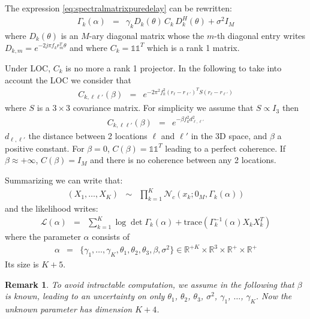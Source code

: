 \documentclass[a4paper, 12pt]{report}
\newcommand{\diag}[1]{\mathrm{diag}\left( #1 \right)}
\newcommand{\trace}[1]{\mathrm{trace}\left( #1 \right)}
\newtheorem{remark}{Remark}
\begin{document}
The expression \eqref{eq:spectralmatrixpuredelay} can be rewritten:
\begin{eqnarray}
\label{eq:spectralmatrixLOC}
\Gamma_{k}(\alpha)&=&\gamma_{k}D_{k}(\theta)\, C_{k}\,D_{k}^{H}(\theta)+\sigma^{2}I_{M}
\end{eqnarray}
where $D_{k}(\theta)$ is an $M$-ary diagonal matrix whose the $m$-th diagonal entry writes $D_{k,m}=e^{-2j\pi f_{k} r_{m}^{T}\theta }$ and where $C_{k}=\mathds{1}\mathds{1}^{T}$ which is a rank 1 matrix.


Under LOC, $C_{k}$ is no more a rank 1 projector.  In the following to take into account the LOC we consider that 
\begin{eqnarray}
 \label{eq:CkwithGauss}
 C_{k,\ell\ell'} (\beta)&=&e^{-2\pi^2f_k^2(r_{\ell}-r_{\ell'})^TS(r_{\ell}-r_{\ell'})}
\end{eqnarray}
where $S$ is a $3\times 3$ covariance matrix. For simplicity we assume that $S\propto I_3$ then
\begin{eqnarray}
 \label{eq:CkwithGauss-2}
 C_{k,\ell\ell'} (\beta)&=&e^{-\beta f_k^2 d_{\ell,\ell'}^2}
\end{eqnarray}
$d_{\ell,\ell'}$ the distance between 2 locations $\ell$ and $\ell'$ in the 3D space, and $\beta$ a positive constant. For $\beta=0$, $C(\beta)=\mathds{1}\mathds{1}^{T}$ leading to a perfect coherence. If $\beta\approx+\infty$, $C(\beta)=I_{M}$ and there is no coherence between any 2 locations.

Summarizing   we can write that:
\begin{eqnarray*}
 (X_{1},\ldots,X_{K}) &\sim&\prod_{k=1}^{K}\mathcal{N}_{c}(x_{k};0_{M},\Gamma_{k}(\alpha))
\end{eqnarray*}
and the likelihood writes:
\begin{eqnarray}
 \mathcal{L}(\alpha)&=&
 \sum_{k=1}^{K}\log\det\Gamma_{k}(\alpha)+\trace{\Gamma_{k}^{-1}(\alpha)X_{k}X_{k}^{T}}
\end{eqnarray}
where the parameter $\alpha$ consists of
\begin{eqnarray}
\alpha&=&
\{
\gamma_{1},\ldots,\gamma_{K},\theta_{1},\theta_{2},\theta_{3},\beta,\sigma^{2}
\}
\in \mathds{R}^{+K}\times  \mathds{R}^{3}\times \mathds{R}^{+}\times \mathds{R}^{+}
\end{eqnarray}
Its size is $K+5$.

\begin{remark}
To avoid intractable computation, we assume in the following that $\beta$ is known, leading to an uncertainty on only $\theta_{1}$, $\theta_{2}$, $\theta_{3}$, $\sigma^{2}$, $\gamma_{1}$, $\ldots$, $\gamma_{K}$. Now the unknown parameter has dimension $K+4$.
\end{remark}
\end{document}

